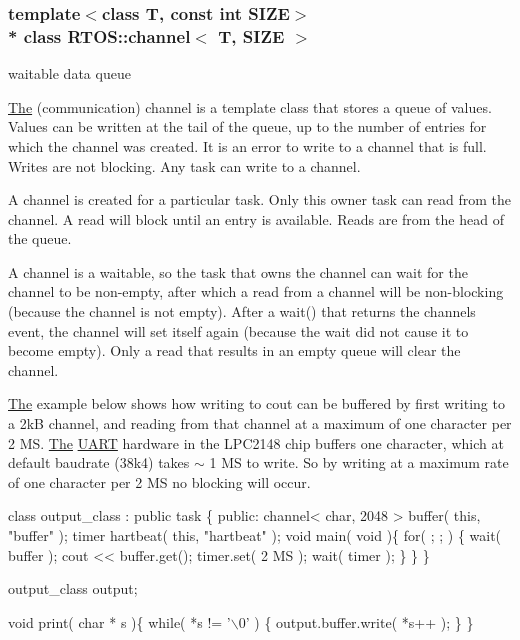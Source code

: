 \subsubsection*{template$<$class T, const int S\+I\+ZE$>$\\*
class R\+T\+O\+S\+::channel$<$ T, S\+I\+Z\+E $>$}

waitable data queue 

\hyperlink{class_the}{The} (communication) channel is a template class that stores a queue of values. Values can be written at the tail of the queue, up to the number of entries for which the channel was created. It is an error to write to a channel that is full. Writes are not blocking. Any task can write to a channel.

A channel is created for a particular task. Only this owner task can read from the channel. A read will block until an entry is available. Reads are from the head of the queue.

A channel is a waitable, so the task that owns the channel can wait for the channel to be non-\/empty, after which a read from a channel will be non-\/blocking (because the channel is not empty). After a wait() that returns the channel\textquotesingle{}s event, the channel will set itself again (because the wait did not cause it to become empty). Only a read that results in an empty queue will clear the channel.

\hyperlink{class_the}{The} example below shows how writing to cout can be buffered by first writing to a 2kB channel, and reading from that channel at a maximum of one character per 2 MS. \hyperlink{class_the}{The} \hyperlink{class_u_a_r_t}{U\+A\+RT} hardware in the L\+P\+C2148 chip buffers one character, which at default baudrate (38k4) takes $\sim$ 1 MS to write. So by writing at a maximum rate of one character per 2 MS no blocking will occur.


\begin{DoxyCode}
\textcolor{keyword}{class }output\_class : \textcolor{keyword}{public} task \{
\textcolor{keyword}{public}:
   channel< char, 2048 > buffer( \textcolor{keyword}{this}, \textcolor{stringliteral}{"buffer"} );
   timer hartbeat( \textcolor{keyword}{this}, \textcolor{stringliteral}{"hartbeat"} );
   \textcolor{keywordtype}{void} main( \textcolor{keywordtype}{void} )\{
      \textcolor{keywordflow}{for}( ; ; ) \{
         wait( buffer );
         cout << buffer.get();
         timer.set( 2 MS );
         wait( timer );
     \}
   \}
\}

output\_class output;

\textcolor{keywordtype}{void} print( \textcolor{keywordtype}{char} * s )\{
   \textcolor{keywordflow}{while}( *s != \textcolor{charliteral}{'\(\backslash\)0'} ) \{ output.buffer.write( *s++ ); \}
\}
\end{DoxyCode}
 


